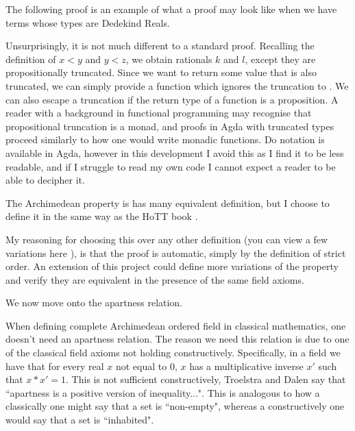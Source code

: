 \documentclass[ProjectReport]{subfiles}
\begin{document}

The following proof is an example of what a proof may look like when we have terms whose types are Dedekind Reals.


Unsurprisingly, it is not much different to a standard proof. Recalling the definition of $x < y$ and $y < z$, we obtain rationals $k$ and $l$, except they are propositionally truncated. Since we want to return some value that is also truncated, we can simply provide a function which ignores the truncation to . We can also escape a truncation if the return type of a function is a proposition. A reader with a background in functional programming may recognise that propositional truncation is a monad, and proofs in Agda with truncated types proceed similarly to how one would write monadic functions. Do notation is available in Agda, however in this development I avoid this as I find it to be less readable, and if I struggle to read my own code I cannot expect a reader to be able to decipher it.

The Archimedean property is has many equivalent definition, but I choose to define it in the same way as the HoTT book \cite[Theorem 11.2.6]{hottbook}. 


My reasoning for choosing this over any other definition (you can view a few variations here \cite{noauthor_archimedean_2022}), is that the proof is automatic, simply by the definition of strict order. An extension of this project could define more variations of the property and verify they are equivalent in the presence of the same field axioms.

We now move onto the apartness relation.


When defining complete Archimedean ordered field in classical mathematics, one doesn't need an apartness relation. The reason we need this relation is due to one of the classical field axioms not holding constructively. Specifically, in a field we have that for every real $x$ not equal to $0$, $x$ has a multiplicative inverse $x'$ such that $x * x' = 1$. This is not sufficient constructively, Troelstra and Dalen say \cite[Page 256]{troelstra1988constructivism} that ``apartness is a positive version of inequality...". This is analogous to how a classically one might say that a set is ``non-empty", whereas a constructively one would say that a set is ``inhabited".
\end{document}
